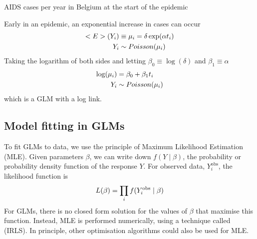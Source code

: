 \begin{example}
	AIDS cases per year in Belgium at the start of the epidemic
	\begin{center}
	\end{center}
	Early in an epidemic, an exponential increase in cases can occur
	\begin{align}
		\mathbb{E}(Y_i) &\equiv \mu_i = \delta\exp(\alpha t_i) \notag \\
		Y_i &\sim Poisson(\mu_i) \notag
	\end{align}
	Taking the logarithm of both sides and letting $\beta_0\equiv\log(\delta)$ and $\beta_1\equiv\alpha$
	\begin{align}
		\log(\mu_i) &= \beta_0 + \beta_1 t_i \notag \\
		Y_i &\sim Poisson(\mu_i) \notag
	\end{align}
	which is a GLM with a log link.
\end{example}

\subsection{Model fitting in GLMs}

To fit GLMs to data, we use the principle of Maximum Likelihood Estimation (MLE). Given parameters $\beta$, we can write down $f(Y\mid \beta)$, the probability or probability density function of the response $Y$. For observed data, $Y_i^{\text{obs}}$, the likelihood function is
\begin{align}
	L(\beta) = \prod_i f(Y_i^{\text{obs}}\mid \beta)\notag
\end{align}
For GLMs, there is no closed form solution for the values of $\beta$ that maximise this function. Instead, MLE is performed numerically, using a technique called  (IRLS). In principle, other optimisation algorithms could also be used for MLE.

